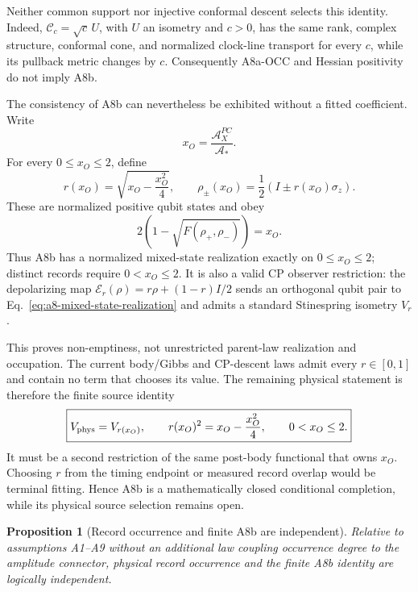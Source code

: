 \documentclass[11pt]{article}
\newtheorem{proposition}{Proposition}
\begin{document}
Neither common support nor injective conformal descent selects this identity.
Indeed, \(\mathcal C_c=\sqrt c\,U\), with \(U\) an isometry and \(c>0\), has
the same rank, complex structure, conformal cone, and normalized clock-line
transport for every \(c\), while its pullback metric changes by \(c\).
Consequently A8a-OCC and Hessian positivity do not imply A8b.

The consistency of A8b can nevertheless be exhibited without a fitted
coefficient.  Write
\begin{equation}
 x_O=\frac{\mathcal A_X^{PC}}{\mathcal A_*}.
 \label{eq:a8-action-ratio}
\end{equation}
For every \(0\leq x_O\leq2\), define
\begin{equation}
 r(x_O)=\sqrt{x_O-\frac{x_O^2}{4}},
 \qquad
 \rho_\pm(x_O)=\frac{1}{2}\left(I\pm r(x_O)\sigma_z\right).
 \label{eq:a8-mixed-state-realization}
\end{equation}
These are normalized positive qubit states and obey
\begin{equation}
 2\left(1-\sqrt{F(\rho_+,\rho_-)}\right)=x_O.
 \label{eq:a8-mixed-state-chord}
\end{equation}
Thus A8b has a normalized mixed-state realization exactly on
\(0\leq x_O\leq2\); distinct records require \(0<x_O\leq2\).  It is also a
valid CP observer restriction: the depolarizing map
\(\mathcal E_r(\rho)=r\rho+(1-r)I/2\) sends an orthogonal qubit pair to
Eq.~\eqref{eq:a8-mixed-state-realization} and admits a standard Stinespring
isometry \(V_r\).

This proves non-emptiness, not unrestricted parent-law realization and
occupation.  The current
body/Gibbs and CP-descent laws admit every \(r\in[0,1]\) and contain no term
that chooses its value.  The remaining physical statement is therefore the
finite source identity
\begin{equation}
 \boxed{
 V_{\rm phys}=V_{r(x_O)},
 \qquad r(x_O)^2=x_O-\frac{x_O^2}{4},
 \qquad0<x_O\leq2.}
 \label{eq:a8-physical-loss-law}
\end{equation}
It must be a second restriction of the same post-body functional that owns
\(x_O\).  Choosing \(r\) from the timing endpoint or measured record overlap
would be terminal fitting.  Hence A8b is a mathematically closed conditional
completion, while its physical source selection remains open.

\begin{proposition}[Record occurrence and finite A8b are independent]
\label{prop:a8-occurrence-independence}
Relative to assumptions A1--A9 without an additional law coupling occurrence
degree to the amplitude connector, physical record occurrence and the finite
A8b identity are logically independent.
\end{proposition}
\end{document}
